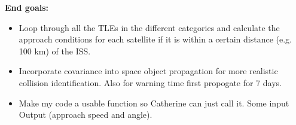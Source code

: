 \documentclass[12pt]{report}
\begin{document}
\noindent \textbf{End goals:}
\begin{itemize}
  \item Loop through all the TLEs in the different categories and calculate the approach conditions for each satellite if it is within a certain distance (e.g. 100 km) of the ISS.
  \item Incorporate covariance into space object propagation for more realistic collision identification. Also for warning time first propogate for 7 days. 
  \item Make my code a usable function so Catherine can just call it. Some input \textrightarrow{} Output (approach speed and angle).
\end{itemize}
\end{document}
